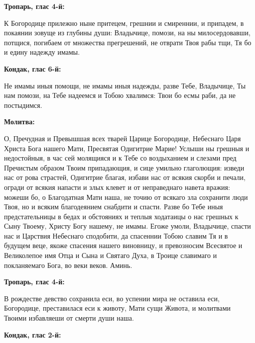 
\bfseries Тропарь, глас 4-й:\normalfont{}\nopagebreak


К Богородице прилежно ныне притецем, грешнии и смиреннии, и припадем, в покаянии зовуще из глубины души: Владычице, помози, на ны милосердовавши, потщися, погибаем от множества прегрешений, не отврати Твоя рабы тщи, Тя бо и едину надежду имамы.


\medskip


\bfseries Кондак, глас 6-й:\normalfont{}\nopagebreak


Не имамы иныя помощи, не имамы иныя надежды, разве Тебе, Владычице, Ты нам помози, на Тебе надеемся и Тобою хвалимся: Твои бо есмы раби, да не постыдимся.


\medskip


\bfseries Молитва:\normalfont{}\nopagebreak


О, Пречудная и Превышшая всех тварей Царице Богородице, Небеснаго Царя Христа Бога нашего Мати, Пресвятая Одигитрие Марие! Услыши ны грешныя и недостойныя, в час сей молящияся и к Тебе со воздыханием и слезами пред Пречистым образом Твоим припадающия, и сице умильно глаголющия: изведи нас от рова страстей, Одигитрие благая, избави нас от всякия скорби и печали, огради от всякия напасти и злых клевет и от неправеднаго навета вражия: можеши бо, о Благодатная Мати наша, не точию от всякаго зла сохранити люди Твоя, но и всяким благодеянием снабдити и спасти. Разве бо Тебе иныя предстательницы в бедах и обстояниях и теплыя ходатаицы о нас грешных к Сыну Твоему, Христу Богу нашему, не имамы. Егоже умоли, Владычице, спасти нас и Царствия Небеснаго сподобити, да спасеннии Тобою славим Тя и в будущем веце, якоже спасения нашего виновницу, и превозносим Всесвятое и Великолепое имя Отца и Сына и Святаго Духа, в Троице славимаго и покланяемаго Бога, во веки веков. Аминь.


\bigskip\bigskip\mychapterending

 


\bfseries Тропарь, глас 4-й:\normalfont{}\nopagebreak


В рождестве девство сохранила еси, во успении мира не оставила еси, Богородице, преставилася еси к животу, Мати сущи Живота, и молитвами Твоими избавляеши от смерти души наша.


\medskip


\bfseries Кондак, глас 2-й:\normalfont{}\nopagebreak


